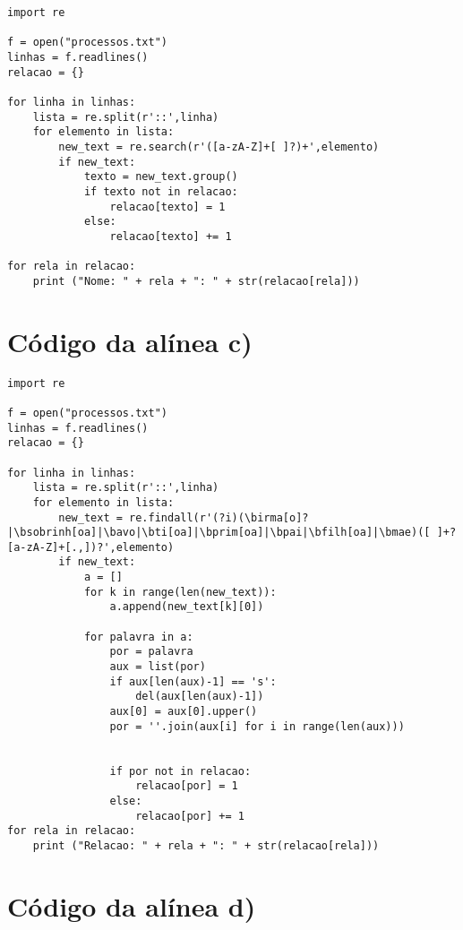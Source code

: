\documentclass[11pt,a4paper]{report}%
\begin{document}
\begin{lstlisting}
import re

f = open("processos.txt")
linhas = f.readlines()
relacao = {}

for linha in linhas: 
    lista = re.split(r'::',linha)
    for elemento in lista: 
        new_text = re.search(r'([a-zA-Z]+[ ]?)+',elemento)
        if new_text: 
            texto = new_text.group() 
            if texto not in relacao: 
                relacao[texto] = 1 
            else: 
                relacao[texto] += 1 

for rela in relacao: 
    print ("Nome: " + rela + ": " + str(relacao[rela]))
\end{lstlisting}

\newpage

\chapter{Código da alínea c)}


\begin{lstlisting}
import re

f = open("processos.txt")
linhas = f.readlines()
relacao = {}

for linha in linhas: 
    lista = re.split(r'::',linha)
    for elemento in lista: 
        new_text = re.findall(r'(?i)(\birma[o]?|\bsobrinh[oa]|\bavo|\bti[oa]|\bprim[oa]|\bpai|\bfilh[oa]|\bmae)([ ]+?[a-zA-Z]+[.,])?',elemento)
        if new_text:
            a = []
            for k in range(len(new_text)): 
                a.append(new_text[k][0])

            for palavra in a:
                por = palavra
                aux = list(por)
                if aux[len(aux)-1] == 's': 
                    del(aux[len(aux)-1])
                aux[0] = aux[0].upper()
                por = ''.join(aux[i] for i in range(len(aux)))


                if por not in relacao: 
                    relacao[por] = 1 
                else: 
                    relacao[por] += 1 
for rela in relacao: 
    print ("Relacao: " + rela + ": " + str(relacao[rela]))
\end{lstlisting}

\newpage

\chapter{Código da alínea d)}
\end{document}
